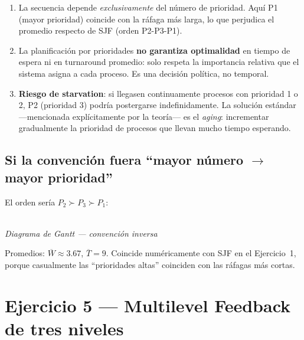 \documentclass[11pt,a4paper]{article}
\begin{document}
\begin{enumerate}[leftmargin=*,nosep]
    \item La secuencia depende \emph{exclusivamente} del número de
        prioridad. Aquí P1 (mayor prioridad) coincide con la ráfaga
        más larga, lo que perjudica el promedio respecto de SJF
        (orden P2-P3-P1).
    \item La planificación por prioridades \textbf{no garantiza
        optimalidad} en tiempo de espera ni en turnaround promedio:
        solo respeta la importancia relativa que el sistema asigna a
        cada proceso. Es una decisión política, no temporal.
    \item \textbf{Riesgo de starvation}: si llegasen continuamente
        procesos con prioridad 1 o 2, P2 (prioridad 3) podría
        postergarse indefinidamente. La solución estándar
        ---mencionada explícitamente por la teoría--- es el
        \emph{aging}: incrementar gradualmente la prioridad de
        procesos que llevan mucho tiempo esperando.
\end{enumerate}

\subsection*{Si la convención fuera ``mayor número $\to$ mayor prioridad''}

El orden sería $P_2 \succ P_3 \succ P_1$:

\begin{center}
\\\small\emph{Diagrama de Gantt --- convención inversa}
\end{center}

Promedios: $\overline{W} \approx 3{.}67$,
$\overline{T} = 9$. Coincide numéricamente con SJF en el
Ejercicio~1, porque casualmente las ``prioridades altas'' coinciden
con las ráfagas más cortas.

\section{Ejercicio 5 --- Multilevel Feedback de tres niveles}
\end{document}
